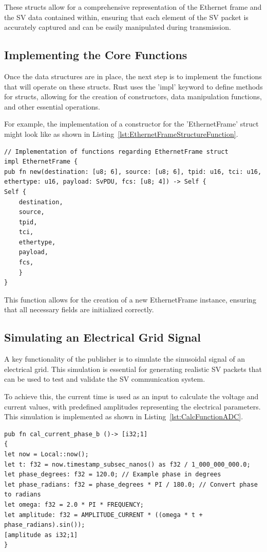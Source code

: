 These structs allow for a comprehensive representation of the Ethernet frame and the SV data contained within, ensuring that each element of the SV packet is accurately captured and can be easily manipulated during transmission.

\subsection{Implementing the Core Functions}

Once the data structures are in place, the next step is to implement the functions that will operate on these structs. Rust uses the 'impl' keyword to define methods for structs, allowing for the creation of constructors, data manipulation functions, and other essential operations.

For example, the implementation of a constructor for the 'EthernetFrame' struct might look like as shown in Listing~\ref{lst:EthernetFrameStructureFunction}.

\begin{lstlisting}[breaklines=true, caption={'Impl' of function in Rust Language.}, label={lst:EthernetFrameStructureFunction}]
// Implementation of functions regarding EthernetFrame struct
impl EthernetFrame {
pub fn new(destination: [u8; 6], source: [u8; 6], tpid: u16, tci: u16, ethertype: u16, payload: SvPDU, fcs: [u8; 4]) -> Self {
Self {
	destination,
	source,
	tpid,
	tci,
	ethertype,
	payload,
	fcs,
	}
}
\end{lstlisting}

This function allows for the creation of a new EthernetFrame instance, ensuring that all necessary fields are initialized correctly.

\subsection{Simulating an Electrical Grid Signal}

A key functionality of the publisher is to simulate the sinusoidal signal of an electrical grid. This simulation is essential for generating realistic SV packets that can be used to test and validate the SV communication system.

To achieve this, the current time is used as an input to calculate the voltage and current values, with predefined amplitudes representing the electrical parameters. This simulation is implemented as shown in Listing~\ref{lst:CalcFunctionADC}.

\begin{lstlisting}[breaklines=true, caption={Simulated Values of current and voltage.}, label={lst:CalcFunctionADC}]
pub fn cal_current_phase_b ()-> [i32;1]
{
let now = Local::now();
let t: f32 = now.timestamp_subsec_nanos() as f32 / 1_000_000_000.0;
let phase_degrees: f32 = 120.0; // Example phase in degrees
let phase_radians: f32 = phase_degrees * PI / 180.0; // Convert phase to radians
let omega: f32 = 2.0 * PI * FREQUENCY;
let amplitude: f32 = AMPLITUDE_CURRENT * ((omega * t + phase_radians).sin());
[amplitude as i32;1]
}
\end{lstlisting}

